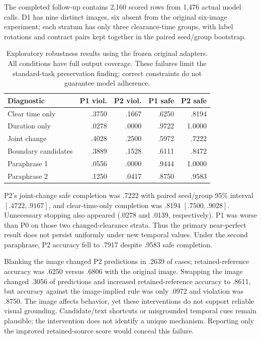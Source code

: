\documentclass[11pt]{article}
\begin{document}
The completed follow-up contains 2,160 scored rows from 1,476 actual model calls.
D1 has nine distinct images, six absent from the original six-image experiment;
each stratum has only three clearance-time groups, with label rotations and
contract pairs kept together in the paired seed/group bootstrap.
\begin{table}[ht]
\centering
\begin{tabular}{lrrrr}
\toprule
Diagnostic & P1 viol. & P2 viol. & P1 safe & P2 safe\\
\midrule
Clear time only & .3750 & .1667 & .6250 & .8194\\
Duration only & .0278 & .0000 & .9722 & 1.0000\\
Joint change & .4028 & .2500 & .5972 & .7222\\
Boundary candidates & .3889 & .1528 & .6111 & .8472\\
Paraphrase 1 & .0556 & .0000 & .9444 & 1.0000\\
Paraphrase 2 & .1250 & .0417 & .8750 & .9583\\
\bottomrule
\end{tabular}
\caption{Exploratory robustness results using the frozen original adapters.
All conditions have full output coverage. These failures limit the standard-task
preservation finding; correct constraints do not guarantee model adherence.}
\end{table}

P2's joint-change safe completion was .7222 with paired seed/group 95\% interval
$[.4722,.9167]$, and clear-time-only completion was .8194 $[.7500,.9028]$.
Unnecessary stopping also appeared (.0278 and .0139, respectively). P1 was worse
than P0 on those two changed-clearance strata. Thus the primary near-perfect
result does not persist uniformly under new temporal values. Under the second
paraphrase, P2 accuracy fell to .7917 despite .9583 safe completion.

Blanking the image changed P2 predictions in .2639 of cases; retained-reference
accuracy was .6250 versus .6806 with the original image. Swapping the image
changed .3056 of predictions and increased retained-reference accuracy to .8611,
but accuracy against the image-implied rule was only .0972 and violation was
.8750. The image affects behavior, yet these interventions do not support reliable
visual grounding. Candidate/text shortcuts or misgrounded temporal cues remain
plausible; the intervention does not identify a unique mechanism. Reporting only
the improved retained-source score would conceal this failure.
\end{document}
